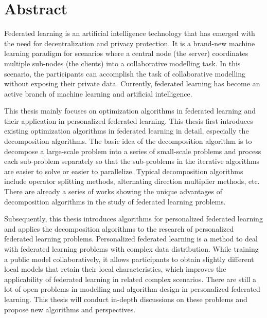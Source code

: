 \chapter*{{Abstract}}%
 \headheight=15.24pt%
 \headheight=15.24pt%


Federated learning is an artificial intelligence technology that has emerged with the need for decentralization and privacy protection. It is a brand-new machine learning paradigm for scenarios where a central node (the server) coordinates multiple sub-nodes (the clients) into a collaborative modelling task. In this scenario, the participants can accomplish the task of collaborative modelling without exposing their private data. Currently, federated learning has become an active branch of machine learning and artificial intelligence.

This thesis mainly focuses on optimization algorithms in federated learning and their application in personalized federated learning. This thesis first introduces existing optimization algorithms in federated learning in detail, especially the decomposition algorithms. The basic idea of the decomposition algorithm is to decompose a large-scale problem into a series of small-scale problems and process each sub-problem separately so that the sub-problems in the iterative algorithms are easier to solve or easier to parallelize. Typical decomposition algorithms include operator splitting methods, alternating direction multiplier methods, etc. There are already a series of works showing the unique advantages of decomposition algorithms in the study of federated learning problems.

Subsequently, this thesis introduces algorithms for personalized federated learning and applies the decomposition algorithms to the research of personalized federated learning problems. Personalized federated learning is a method to deal with federated learning problems with complex data distribution. While training a public model collaboratively, it allows participants to obtain slightly different local models that retain their local characteristics, which improves the applicability of federated learning in related complex scenarios. There are still a lot of open problems in modelling and algorithm design in personalized federated learning. This thesis will conduct in-depth discussions on these problems and propose new algorithms and perspectives.

